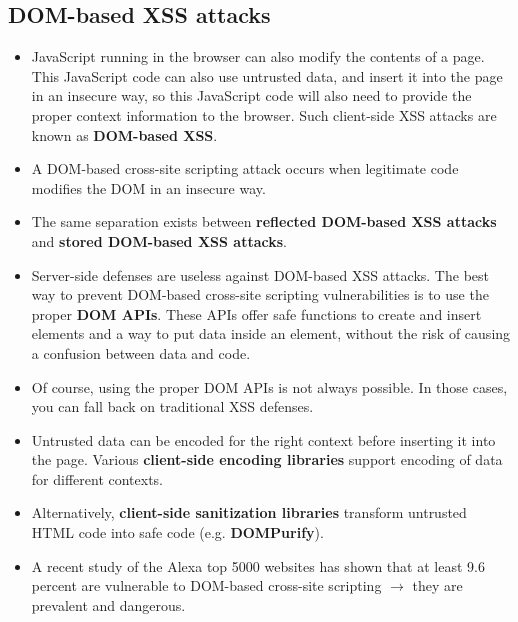 \documentclass[../main.tex]{subfiles}
\begin{document}
\subsection{DOM-based XSS attacks}
\begin{itemize}
\item JavaScript running in the browser can also modify the contents of a page. This JavaScript code can also use untrusted data, and insert it into the page in an insecure way, so this JavaScript code will also need to provide the proper context information to the browser. Such client-side XSS attacks are known as \textbf{DOM-based XSS}.
\item A DOM-based cross-site scripting attack occurs when legitimate code modifies the DOM in an insecure way.
\item The same separation exists between \textbf{reflected DOM-based XSS attacks} and \textbf{stored DOM-based XSS attacks}.
\item Server-side defenses are useless against DOM-based XSS attacks. The best way to prevent DOM-based cross-site scripting vulnerabilities is to use the proper \textbf{DOM APIs}. These APIs offer safe functions to create and insert elements and a way to put data inside an element, without the risk of causing a confusion between data and code.
\item Of course, using the proper DOM APIs is not always possible. In those cases, you can fall back on traditional XSS defenses.
\item Untrusted data can be encoded for the right context before inserting it into the page. Various \textbf{client-side encoding libraries} support encoding of data for different contexts.
\item Alternatively, \textbf{client-side sanitization libraries} transform untrusted HTML code into safe code (e.g. \textbf{DOMPurify}).
\item A recent study of the Alexa top 5000 websites has shown that at least 9.6 percent are vulnerable to DOM-based cross-site scripting $\rightarrow$ they are prevalent and dangerous.
\end{itemize}
\end{document}
